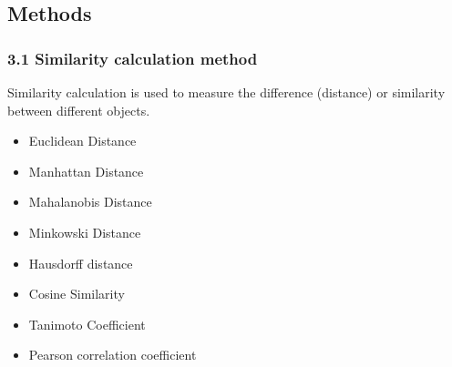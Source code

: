 \documentclass[notheorems,serif,table,compress]{beamer}  %
\begin{document}
\subsection{Methods}
\begin{frame}
\frametitle{3.1 Similarity calculation method}
Similarity calculation is used to measure the difference (distance) or similarity between different objects.    
\begin{itemize}
        \item Euclidean Distance
        \item Manhattan Distance
        \item Mahalanobis Distance
        \item Minkowski Distance
        \item Hausdorff distance\newline
        
        \item Cosine Similarity
        \item Tanimoto Coefficient
        \item Pearson correlation coefficient
    \end{itemize}
\end{frame}

\end{document}
